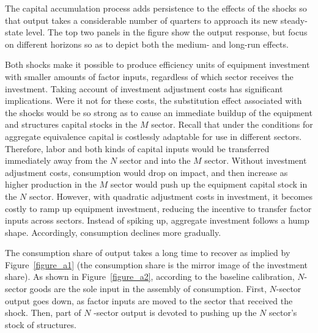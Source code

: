 \documentclass[12pt,fleqn]{article}
\begin{document}
{\normalsize
%
}

{\normalsize The capital accumulation process adds persistence to the
effects of the shocks so that output takes a considerable number of quarters
to approach its new steady-state level. The top two panels in the figure
show the output response, but focus on different horizons so as to depict
both the medium- and long-run effects. }

{\normalsize Both shocks make it possible to produce efficiency units of
equipment investment with smaller amounts of factor inputs, regardless of
which sector receives the investment. Taking account of investment
adjustment costs has significant implications. Were it not for these costs,
the substitution effect associated with the shocks would be so strong as to
cause an immediate buildup of the equipment and structures capital stocks in
the $M$ sector. Recall that under the conditions for aggregate equivalence
capital is costlessly adaptable for use in different sectors. Therefore,
labor and both kinds of capital inputs would be transferred immediately away
from the $N$ sector and into the $M$ sector. Without investment adjustment
costs, consumption would drop on impact, and then increase as higher
production in the $M$ sector would push up the equipment capital stock in
the $N$ sector. However, with quadratic adjustment costs in investment, it
becomes costly to ramp up equipment investment, reducing the incentive to
transfer factor inputs across sectors. Instead of spiking up, aggregate
investment follows a hump shape. Accordingly, consumption declines more
gradually. }

{\normalsize The consumption share of output takes a long time to recover as
implied by Figure~\ref{figure_a1} (the consumption share is the mirror image
of the investment share). As shown in Figure~\ref{figure_a2}, according to
the baseline calibration, $N$-sector goods are the sole input in the
assembly of consumption. First, $N$-sector output goes down, as factor
inputs are moved to the sector that received the shock. Then, part of $N$%
-sector output is devoted to pushing up the $N$ sector's stock of
structures.  }
\end{document}
